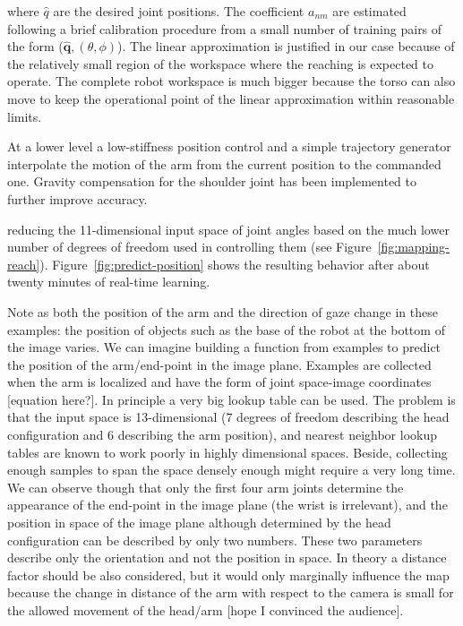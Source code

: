 \noindent where $\hat{q}$ are the desired joint positions. The coefficient
$a_{nm}$ are estimated following a brief calibration procedure from a small 
number of training pairs of the form ($\mathbf{\hat{q}}, (\theta, \phi)$).
The linear approximation is justified in our case because of the relatively small 
region of the workspace where the reaching is expected to operate. The 
complete robot workspace is much bigger because the torso can also move to keep
the operational point of the linear approximation within reasonable limits.

At a lower level a low-stiffness position control and a simple trajectory generator
interpolate the motion of the arm from the current position to the commanded one.
Gravity compensation for the shoulder joint has been implemented to further 
improve accuracy.

\ifverbose
reducing the 11-dimensional input space of joint angles based on 
the much lower number of degrees of freedom used in controlling them
(see Figure~\ref{fig:mapping-reach}).
Figure~\ref{fig:predict-position} shows the resulting behavior
after about twenty minutes of real-time learning. 
\fi

%
\ifverbose
Note as both the
position of the arm and the direction of gaze change in these
examples: the position of objects such as the base of the robot at the
bottom of the image varies.
\fi
%
\ifverbose
We can imagine building a function from examples to predict the
position of the arm/end-point in the image plane. Examples are
collected when the arm is localized and have the form of joint
space-image coordinates [equation here?]. In principle a very big
lookup table can be used. The problem is that the input space is
13-dimensional (7 degrees of freedom describing the head configuration
and 6 describing the arm position), and nearest neighbor lookup tables
are known to work poorly in highly dimensional spaces. Beside,
collecting enough samples to span the space densely enough might
require a very long time. We can observe though that only the first
four arm joints determine the appearance of the end-point in the image
plane (the wrist is irrelevant), and the position in space of the
image plane although determined by the head configuration can be
described by only two numbers. These two parameters describe only the
orientation and not the position in space. In theory a distance factor
should be also considered, but it would only marginally influence the
map because the change in distance of the arm with respect to the
camera is small for the allowed movement of the head/arm [hope I
convinced the audience].
\fi


